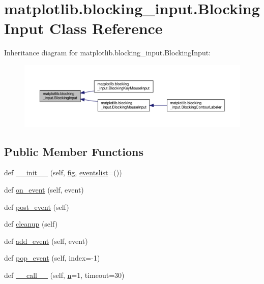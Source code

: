 \hypertarget{classmatplotlib_1_1blocking__input_1_1BlockingInput}{}\section{matplotlib.\+blocking\+\_\+input.\+Blocking\+Input Class Reference}
\label{classmatplotlib_1_1blocking__input_1_1BlockingInput}


Inheritance diagram for matplotlib.\+blocking\+\_\+input.\+Blocking\+Input\+:
\nopagebreak
\begin{figure}[H]
\begin{center}
\leavevmode
\includegraphics[width=350pt]{classmatplotlib_1_1blocking__input_1_1BlockingInput__inherit__graph}
\end{center}
\end{figure}
\subsection*{Public Member Functions}
\begin{DoxyCompactItemize}
\item 
def \hyperlink{classmatplotlib_1_1blocking__input_1_1BlockingInput_a88b11e48cb3625f0ea485b97eba78347}{\+\_\+\+\_\+init\+\_\+\+\_\+} (self, \hyperlink{classmatplotlib_1_1blocking__input_1_1BlockingInput_aee554aa34b7799bef4ad2406ed6a7e0c}{fig}, \hyperlink{classmatplotlib_1_1blocking__input_1_1BlockingInput_a3e111b65af4efc37cfe9bcf301cc81a5}{eventslist}=())
\item 
def \hyperlink{classmatplotlib_1_1blocking__input_1_1BlockingInput_a753fe68b7702fa864696db1854485e40}{on\+\_\+event} (self, event)
\item 
def \hyperlink{classmatplotlib_1_1blocking__input_1_1BlockingInput_a5e7b5a798392f01df8c7877bf18c5c61}{post\+\_\+event} (self)
\item 
def \hyperlink{classmatplotlib_1_1blocking__input_1_1BlockingInput_a395fd2f0f16ac473fe46e56045df9c8b}{cleanup} (self)
\item 
def \hyperlink{classmatplotlib_1_1blocking__input_1_1BlockingInput_a34d755d45b6909f66db04607d2d558d1}{add\+\_\+event} (self, event)
\item 
def \hyperlink{classmatplotlib_1_1blocking__input_1_1BlockingInput_a092371bbf637c3d725448bc93b29bb39}{pop\+\_\+event} (self, index=-\/1)
\item 
def \hyperlink{classmatplotlib_1_1blocking__input_1_1BlockingInput_aa106cec4e799e541adb5e16bb8e97af8}{\+\_\+\+\_\+call\+\_\+\+\_\+} (self, \hyperlink{classmatplotlib_1_1blocking__input_1_1BlockingInput_aa532e64cc6bd2af20bbb5c74a35d84c2}{n}=1, timeout=30)
\end{DoxyCompactItemize}

